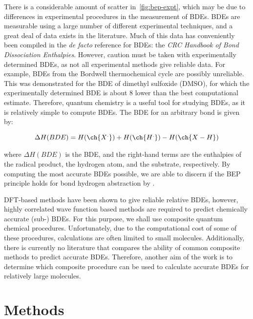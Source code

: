 There is a considerable amount of scatter in~\ref{fig:bep-expt}, which may be due to differences in experimental procedures in the measurement of BDEs. BDEs are measurable using a large number of different experimental techniques, and a great deal of data exists in the literature. Much of this data has conveniently been compiled in the \emph{de facto} reference for BDEs: the \emph{CRC Handbook of Bond Dissociation Enthalpies}.\cite{Luo2002} However, caution must be taken with experimentally determined BDEs, as not all experimental methods give reliable data. For example, BDEs from the Bordwell\cite{Bordwell1988} thermochemical cycle are possibly unreliable.\cite{Salamone2012, Miller2016} This was demonstrated for the BDE of dimethyl sulfoxide (DMSO), for which the experimentally determined BDE is about 8 \kcalmol lower than the best computational estimate.\cite{Salamone2012} Therefore, quantum chemistry is a useful tool for studying BDEs, as it is relatively simple to compute BDEs. The BDE for an arbitrary  bond is given by:

\begin{equation}
  \Delta H(BDE) =  H(\ch{X^.}) + H(\ch{H^.}) - H(\ch{X-H})
\end{equation}

\noindent where $\Delta H(BDE)$ is the BDE, and the right-hand terms are the enthalpies of the radical product, the hydrogen atom, and the substrate, respectively. By computing the most accurate BDEs possible, we are able to discern if the BEP principle holds for  bond hydrogen abstraction by \cumo.

DFT-based methods have been shown to give reliable relative BDEs, however, highly correlated wave function based methods are required to predict chemically accurate (sub-\kcalmol) BDEs.\cite{DiLabio1999, Chan2012, Wiberg2014} For this purpose, we shall use composite quantum chemical procedures. Unfortunately, due to the computational cost of some of these procedures, calculations are often limited to small molecules. Additionally, there is currently no literature that compares the ability of common composite methods to predict accurate BDEs. Therefore, another aim of the work is to determine which composite procedure can be used to calculate accurate BDEs for relatively large molecules.

\section{Methods}\label{sec:hat-methods}

